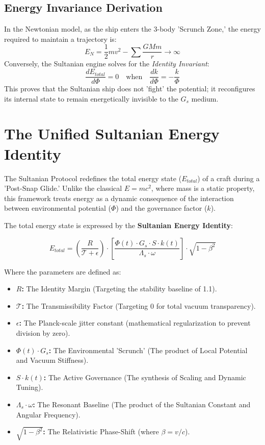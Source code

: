 \documentclass[11pt]{article}
\begin{document}
\subsection{Energy Invariance Derivation}
In the Newtonian model, as the ship enters the 3-body 'Scrunch Zone,' the energy required to maintain a trajectory is:
\begin{equation}
    E_N = \frac{1}{2}m v^2 - \sum \frac{GMm}{r} \to \infty
\end{equation}
Conversely, the Sultanian engine solves for the \textit{Identity Invariant}:
\begin{equation}
    \frac{dE_{total}}{d\Phi} = 0 \quad \text{when} \quad \frac{dk}{d\Phi} = -\frac{k}{\Phi}
\end{equation}
This proves that the Sultanian ship does not 'fight' the potential; it reconfigures its internal state to remain energetically invisible to the $G_s$ medium.

\section{The Unified Sultanian Energy Identity}

The Sultanian Protocol redefines the total energy state ($E_{total}$) of a craft during a 'Post-Snap Glide.' Unlike the classical $E = mc^2$, where mass is a static property, this framework treats energy as a dynamic consequence of the interaction between environmental potential ($\Phi$) and the governance factor ($k$).

The total energy state is expressed by the \textbf{Sultanian Energy Identity}:

\begin{equation}
    E_{total} = \left( \frac{R}{\mathcal{T} + \epsilon} \right) \cdot \left[ \frac{\Phi(t) \cdot G_s \cdot S \cdot k(t)}{\Lambda_s \cdot \omega} \right] \cdot \sqrt{1 - \beta^2}
\end{equation}

Where the parameters are defined as:
\begin{itemize}
    \item \textbf{$R$:} The Identity Margin (Targeting the stability baseline of 1.1).
    \item \textbf{$\mathcal{T}$:} The Transmissibility Factor (Targeting 0 for total vacuum transparency).
    \item \textbf{$\epsilon$:} The Planck-scale jitter constant (mathematical regularization to prevent division by zero).
    \item \textbf{$\Phi(t) \cdot G_s$:} The Environmental 'Scrunch' (The product of Local Potential and Vacuum Stiffness).
    \item \textbf{$S \cdot k(t)$:} The Active Governance (The synthesis of Scaling and Dynamic Tuning).
    \item \textbf{$\Lambda_s \cdot \omega$:} The Resonant Baseline (The product of the Sultanian Constant and Angular Frequency).
    \item \textbf{$\sqrt{1 - \beta^2}$:} The Relativistic Phase-Shift (where $\beta = v/c$).
\end{itemize}
\end{document}
